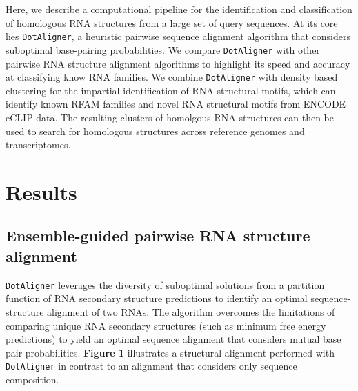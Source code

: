 \documentclass[a4paper,11pt]{article}
\newcommand\dotaligner{\texttt{DotAligner}}
\begin{document}
Here, we describe a computational pipeline for the identification and classification of
homologous RNA structures from a large set of query sequences. At its core lies \dotaligner{}, a
heuristic pairwise sequence alignment algorithm that considers suboptimal 
base-pairing probabilities. We compare \dotaligner{} with other pairwise RNA structure 
alignment algorithms to highlight its speed and accuracy at classifying know RNA families. 
We combine \dotaligner{} with density based clustering for the impartial identification of 
RNA structural motifs, which can identify known RFAM families and novel RNA structural 
motifs from ENCODE eCLIP data. The resulting clusters of homolgous RNA structures can then 
be used to search for homologous structures across reference genomes and transcriptomes.  

\section*{ Results }
\subsection*{ Ensemble-guided pairwise RNA structure alignment} 
 
\dotaligner{} leverages the diversity of  suboptimal solutions from a partition function of RNA secondary structure predictions to identify an optimal sequence-structure alignment of two RNAs. 
The algorithm overcomes the limitations of comparing unique RNA 
secondary structures (such as minimum free energy predictions) to yield 
an optimal sequence alignment that considers mutual base pair probabilities.
\textbf{Figure 1} illustrates a structural alignment performed with \dotaligner{}
in contrast to an alignment that considers only sequence composition.\\
\end{document}
